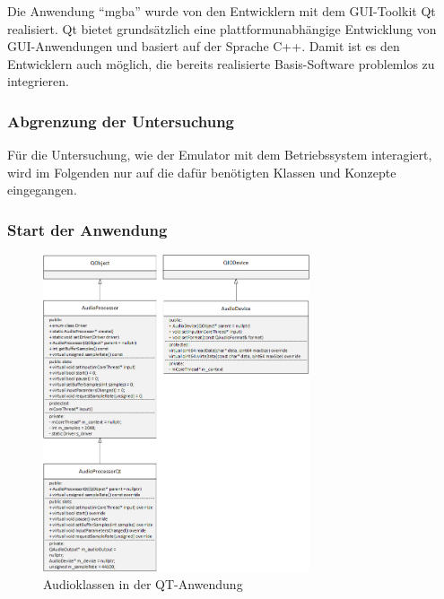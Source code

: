\documentclass[11pt,a4paper]{scrartcl}
\begin{document}
Die Anwendung \enquote{mgba} wurde von den Entwicklern mit dem GUI-Toolkit Qt realisiert. Qt bietet grunds\"atzlich eine plattformunabh\"angige Entwicklung von
GUI-Anwendungen und basiert auf der Sprache C++. Damit ist es den Entwicklern auch m\"oglich, die bereits realisierte Basis-Software problemlos zu integrieren.

\subsubsection{Abgrenzung der Untersuchung}

F\"ur die Untersuchung, wie der Emulator mit dem Betriebssystem interagiert, wird im Folgenden nur auf die daf\"ur ben\"otigten Klassen und Konzepte eingegangen.

\subsubsection{Start der Anwendung}

 

\newpage

\begin{figure}[h]
    \centering
    \includegraphics[width=0.7\textwidth]{QT_Klassendiagramm}
    \caption{Audioklassen in der QT-Anwendung}
    \label{fig:qtclassdiagramm}
\end{figure}


\end{document}
